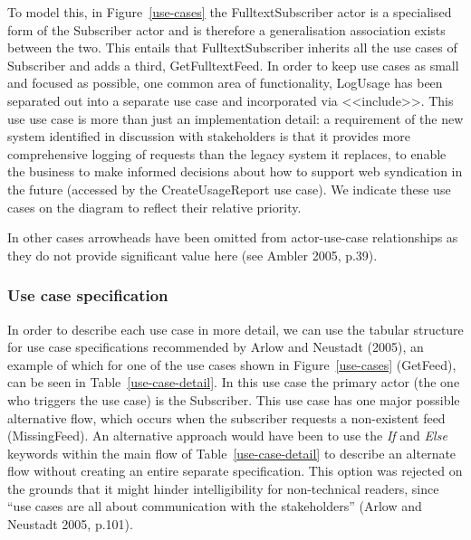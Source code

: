 \documentclass[a4paper]{article}
\begin{document}
To model this, in Figure~\ref{use-cases} the \textsf{FulltextSubscriber} actor is a specialised form of the \textsf{Subscriber} actor and is therefore a generalisation association exists between the two. This entails that \textsf{FulltextSubscriber} inherits all the use cases of \textsf{Subscriber} and adds a third, \textsf{GetFulltextFeed}. In order to keep use cases as small and focused as possible, one common area of functionality, \textsf{LogUsage} has been separated out into a separate use case and incorporated via \textsf{<<include>>}. This use use case is more than just an implementation detail: a requirement of the new system identified in discussion with stakeholders is that it provides more comprehensive logging of requests than the legacy system it replaces, to enable the business to make informed decisions about how to support web syndication in the future (accessed by the \textsf{CreateUsageReport} use case). We indicate these use cases on the diagram to reflect their relative priority.

In other cases arrowheads have been omitted from actor-use-case relationships as they do not provide significant value here (see Ambler 2005, p.39).

\subsubsection{Use case specification}

In order to describe each use case in more detail, we can use the tabular structure for use case specifications recommended by Arlow and Neustadt (2005), an example of which for one of the use cases shown in Figure~\ref{use-cases} (\textsf{GetFeed}), can be seen in Table~\ref{use-case-detail}. In this use case the primary actor (the one who triggers the use case) is the \textsf{Subscriber}. This use case has one major possible alternative flow, which occurs when the subscriber requests a non-existent feed (\textsf{MissingFeed}). An alternative approach would have been to use the \textit{If} and \textit{Else} keywords within the main flow of Table~\ref{use-case-detail} to describe an alternate flow without creating an entire separate specification. This option was rejected on the grounds that it might hinder intelligibility for non-technical readers, since ``use cases are all about communication with the stakeholders'' (Arlow and Neustadt 2005, p.101).

\end{document}
